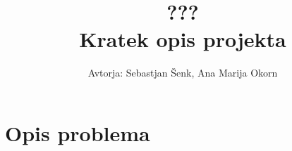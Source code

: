 \documentclass[a4, 12pt]{article}
\begin{document}
\title{ ??? \\
  \large Kratek opis projekta}

\author{Avtorja: Sebastjan Šenk, Ana Marija Okorn}

\maketitle

\section{Opis problema}
\end{document}
